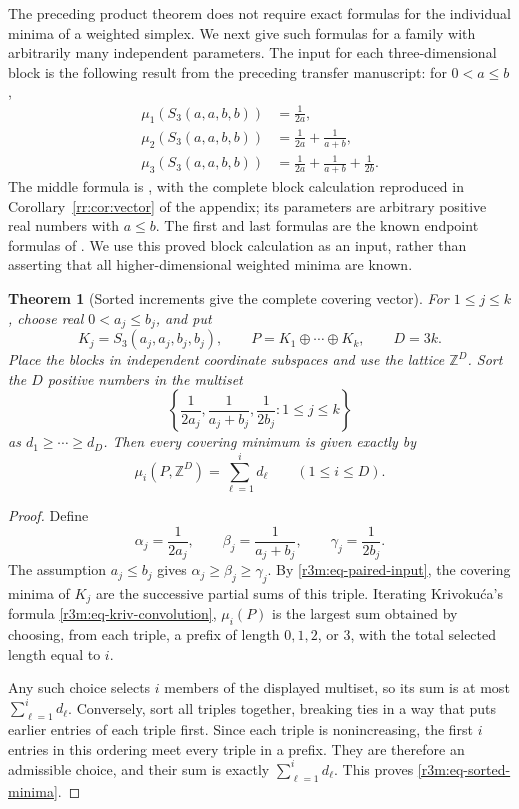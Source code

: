 \documentclass[11pt,a4paper]{article}
\newtheorem{theorem}{Theorem}[section]
\theoremstyle{remark}\newtheorem{remark}[theorem]{Remark}
\begin{document}
The preceding product theorem does not require exact formulas for
the individual minima of a weighted simplex.  We next give such
formulas for a family with arbitrarily many independent parameters.
The input for each three-dimensional block is the following result
from the preceding transfer manuscript:
for $0<a\le b$,
\begin{equation}
\label{r3m:eq-paired-input}
 \begin{aligned}
 \mu_1(S_3(a,a,b,b))&=\frac1{2a},\\
 \mu_2(S_3(a,a,b,b))&=\frac1{2a}+\frac1{a+b},\\
 \mu_3(S_3(a,a,b,b))&=\frac1{2a}+\frac1{a+b}+\frac1{2b}.
 \end{aligned}
\end{equation}
The middle formula is
\cite[Theorem~4.2 and Corollary~4.4]{TransferTwo}, with the complete
block calculation reproduced in Corollary~\ref{rr:cor:vector} of
the appendix; its parameters are arbitrary positive real numbers
with $a\le b$.
The first and last formulas are the known endpoint formulas of
\cite{CSS}.  We use this proved block calculation as an input,
rather than asserting that all higher-dimensional weighted minima
are known.

\begin{theorem}[Sorted increments give the complete covering vector]
\label{r3m:thm-sorted-minima}
For $1\le j\le k$, choose real $0<a_j\le b_j$, and put
\[
 K_j=S_3(a_j,a_j,b_j,b_j),\qquad
 P=K_1\oplus\cdots\oplus K_k,\qquad D=3k.
\]
Place the blocks in independent coordinate subspaces and use the
lattice $\mathbb Z^D$.
Sort the $D$ positive numbers in the multiset
\[
 \left\{\frac1{2a_j},\frac1{a_j+b_j},\frac1{2b_j}
                                      :1\le j\le k\right\}
\]
as $d_1\ge\cdots\ge d_D$.
Then every covering minimum is given exactly by
\begin{equation}
\label{r3m:eq-sorted-minima}
 \mu_i(P,\mathbb Z^D)=\sum_{\ell=1}^i d_\ell
             \qquad(1\le i\le D).
\end{equation}
\end{theorem}

\begin{proof}
Define
\[
 \alpha_j=\frac1{2a_j},\qquad
 \beta_j=\frac1{a_j+b_j},\qquad
 \gamma_j=\frac1{2b_j}.
\]
The assumption $a_j\le b_j$ gives
$\alpha_j\ge\beta_j\ge\gamma_j$.
By \eqref{r3m:eq-paired-input}, the covering minima of $K_j$
are the successive partial sums of this triple.
Iterating Krivoku\'ca's formula
\eqref{r3m:eq-kriv-convolution}, $\mu_i(P)$ is the largest sum
obtained by choosing, from each triple, a prefix of length
$0,1,2$, or $3$, with the total selected length equal to $i$.

Any such choice selects $i$ members of the displayed multiset, so
its sum is at most $\sum_{\ell=1}^i d_\ell$.
Conversely, sort all triples together, breaking ties in a way that
puts earlier entries of each triple first.
Since each triple is nonincreasing, the first $i$ entries in this
ordering meet every triple in a prefix.
They are therefore an admissible choice, and their sum is exactly
$\sum_{\ell=1}^i d_\ell$.  This proves \eqref{r3m:eq-sorted-minima}.
\end{proof}
\end{document}
